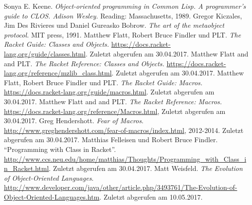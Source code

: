 \begin{thebibliography}{}
  Sonya E. Keene. \emph{Object-oriented programming in Common Lisp. A programmer's guide to CLOS. Adison Wesley.} Reading: Massachusetts, 1989. 
  Gregor Kiczales, Jim Des Rivieres und Daniel Gureasko Bobrow. \emph{The art of the metaobject protocol.} MIT press, 1991.
  Matthew Flatt, Robert Bruce Findler und PLT. \emph{The Racket Guide: Classes and Objects.} \url{https://docs.racket-lang.org/guide/classes.html}. Zuletzt abgerufen am 30.04.2017.
  Matthew Flatt and and PLT. \emph{The Racket Reference: Classes and Objects.} \url{https://docs.racket-lang.org/reference/mzlib\_class.html}. Zuletzt abgerufen am 30.04.2017.
   Matthew Flatt, Robert Bruce Findler und PLT. \emph{The Racket Guide: Macros.} \url{https://docs.racket-lang.org/guide/macros.html}. Zuletzt abgerufen am 30.04.2017.
  Matthew Flatt and and PLT. \emph{The Racket Reference:  Macros.} \url{https://docs.racket-lang.org/reference/Macros.html}, Zuletzt abgerufen am 30.04.2017.
  Greg Hendershott. \emph{Fear of Macros}.  \\\url{http://www.greghendershott.com/fear-of-macros/index.html}, 2012-2014. Zuletzt abgerufen am 30.04.2017.
  Matthias Felleisen und Robert Bruce Findler. ``Programming with Class in Racket''. \url{http://www.ccs.neu.edu/home/matthias/Thoughts/Programming\_with\_Class\_in\_Racket.html}. Zuletzt abgerufen am 30.04.2017.
  Matt Weisfeld. \emph{The Evolution of Object-Oriented Languages}. \url{http://www.developer.com/java/other/article.php/3493761/The-Evolution-of-Object-Oriented-Languages.htm}. Zuletzt abgerufen am 10.05.2017.
\end{thebibliography}

\cleardoublepage